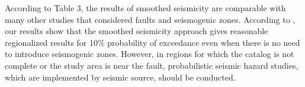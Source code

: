 According to Table 3, the results of smoothed seismicity  are comparable with many other studies that considered faults and seismogenic zones. According to \citet{BHRC2014}, our results show that the smoothed seismicity approach gives reasonable regionalized results for 10\% probability of exceedance even when there is no need to introduce seismogenic zones. However, in regions for which the catalog is not complete or the study area is near the fault, probabilistic seismic hazard studies, which are implemented by seismic source, should be conducted. 


